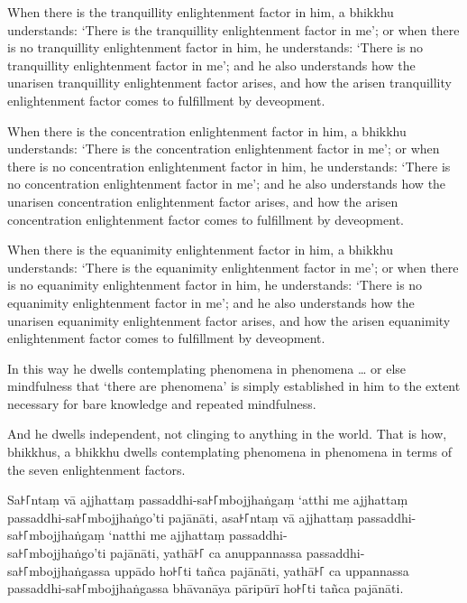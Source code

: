 \englishPage

When there is the tranquillity enlightenment factor in him, a bhikkhu
understands: `There is the tranquillity enlightenment factor in me'; or when
there is no tranquillity enlightenment factor in him, he understands: `There is
no tranquillity enlightenment factor in me'; and he also understands how the
unarisen tranquillity enlightenment factor arises, and how the arisen
tranquillity enlightenment factor comes to fulfillment by deveopment.

When there is the concentration enlightenment factor in him, a bhikkhu
understands: `There is the concentration enlightenment factor in me'; or when
there is no concentration enlightenment factor in him, he understands: `There is
no concentration enlightenment factor in me'; and he also understands how the
unarisen concentration enlightenment factor arises, and how the arisen
concentration enlightenment factor comes to fulfillment by deveopment.

When there is the equanimity enlightenment factor in him, a bhikkhu understands:
`There is the equanimity enlightenment factor in me'; or when there is no
equanimity enlightenment factor in him, he understands: `There is no equanimity
enlightenment factor in me'; and he also understands how the unarisen equanimity
enlightenment factor arises, and how the arisen equanimity enlightenment factor
comes to fulfillment by deveopment.

\enlargethispage{2\baselineskip}

In this way he dwells contemplating phenomena in phenomena \ldots{} or else
mindfulness that ‘there are phenomena’ is simply established in him to the
extent necessary for bare knowledge and repeated mindfulness.

And he dwells independent, not clinging to anything in the world. That is how,
bhikkhus, a bhikkhu dwells contemplating phenomena in phenomena in terms of the
seven enlightenment factors.


\paliPage

Sa꜔꜒ntaṃ vā ajjhattaṃ passaddhi-sa꜔꜒mbojjhaṅgaṃ ‘atthi me ajjhattaṃ passaddhi-sa꜔꜒mbojjhaṅgo’ti pajānāti,
asa꜔꜒ntaṃ vā ajjhattaṃ passaddhi-sa꜔꜒mbojjhaṅgaṃ ‘natthi me ajjhattaṃ passaddhi-\\ sa꜔꜒mbojjhaṅgo’ti pajānāti,
yathā꜔꜒ ca anuppannassa passaddhi-\\ sa꜔꜒mbojjhaṅgassa uppādo ho꜔꜒ti tañca pajānāti,
yathā꜔꜒ ca uppannassa passaddhi-sa꜔꜒mbojjhaṅgassa bhāvanāya pāripūrī ho꜔꜒ti tañca pajānāti.

